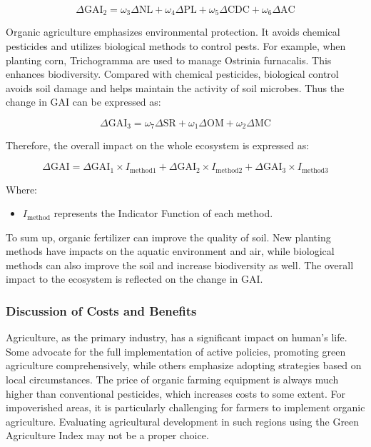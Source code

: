 \documentclass[12pt]{article}  %
\begin{document}
\begin{equation}
\Delta\text{GAI}_2 = \omega_3 \Delta\text{NL} + \omega_4 \Delta\text{PL} + \omega_5 \Delta\text{CDC} + \omega_6 \Delta\text{AC}
\end{equation}


Organic agriculture emphasizes environmental protection. It avoids chemical pesticides and utilizes biological methods to control pests. For example, when planting corn, Trichogramma are used to manage Ostrinia furnacalis. This enhances biodiversity. Compared with chemical pesticides, biological control avoids soil damage and helps maintain the activity of soil microbes. Thus the change in GAI can be expressed as:

\begin{equation}
\Delta\text{GAI}_3 = \omega_7 \Delta\text{SR} + \omega_1 \Delta\text{OM} + \omega_2 \Delta\text{MC}
\end{equation}

Therefore, the overall impact on the whole ecosystem is expressed as:

\begin{equation}
\Delta\text{GAI} = \Delta\text{GAI}_1 \times I_{\text{method1}} + \Delta\text{GAI}_2 \times I_{\text{method2}} + \Delta\text{GAI}_3 \times I_{\text{method3}}
\end{equation}

Where:
\begin{itemize}
    \item $I_{\text{method}}$ represents the Indicator Function of each method.
\end{itemize}

To sum up, organic fertilizer can improve the quality of soil. New planting methods have impacts on the aquatic environment and air, while biological methods can also improve the soil and increase biodiversity as well. The overall impact to the ecosystem is reflected on the change in GAI.

\subsubsection{Discussion of Costs and Benefits}

Agriculture, as the primary industry, has a significant impact on human’s life. Some advocate for the full implementation of active policies, promoting green agriculture comprehensively, while others emphasize adopting strategies based on local circumstances. The price of organic farming equipment is always much higher than conventional pesticides, which increases costs to some extent. For impoverished areas, it is particularly challenging for farmers to implement organic agriculture. Evaluating agricultural development in such regions using the Green Agriculture Index may not be a proper choice.
\end{document}

